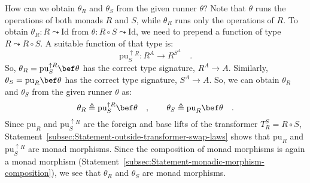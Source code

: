 How can we obtain $\theta_{R}$ and $\theta_{S}$ from the given runner
$\theta$? Note that $\theta$ runs the operations of both monads
$R$ and $S$, while $\theta_{R}$ runs only the operations of $R$.
To obtain $\theta_{R}:R\leadsto\text{Id}$ from $\theta:R\circ S\leadsto\text{Id}$,
we need to prepend a function of type $R\leadsto R\circ S$. A suitable
function of that type is:
\[
\text{pu}_{S}^{\uparrow R}:R^{A}\rightarrow R^{S^{A}}\quad.
\]
So, $\theta_{R}=\text{pu}_{S}^{\uparrow R}\bef\theta$ has the correct
type signature, $R^{A}\rightarrow A$. Similarly, $\theta_{S}=\text{pu}_{R}\bef\theta$
has the correct type signature, $S^{A}\rightarrow A$. So, we can
obtain $\theta_{R}$ and $\theta_{S}$ from the given runner $\theta$
as:
\[
\theta_{R}\triangleq\text{pu}_{S}^{\uparrow R}\bef\theta\quad,\quad\quad\theta_{S}\triangleq\text{pu}_{R}\bef\theta\quad.
\]
Since $\text{pu}_{R}$ and $\text{pu}_{S}^{\uparrow R}$ are the foreign
and base lifts of the transformer $T_{R}^{S}=R\circ S$, Statement~\ref{subsec:Statement-outside-transformer-swap-laws}
shows that $\text{pu}_{R}$ and $\text{pu}_{S}^{\uparrow R}$ are
monad morphisms. Since the composition of monad morphisms is again
a monad morphism (Statement~\ref{subsec:Statement-monadic-morphism-composition}),
we see that $\theta_{R}$ and $\theta_{S}$ are monad morphisms.


